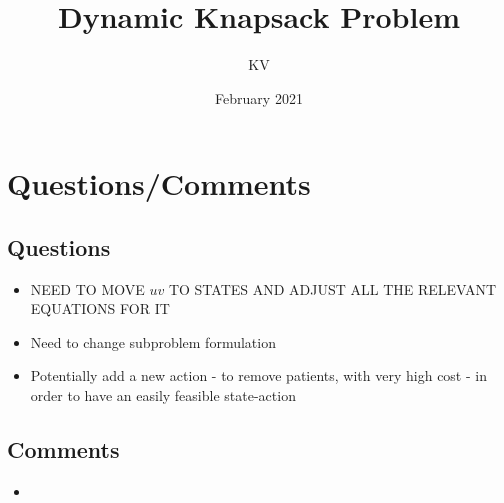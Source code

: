 \documentclass{article}
\title{Dynamic Knapsack Problem}
\author{KV}
\date{February 2021}
\begin{document}
\maketitle
\tableofcontents

\section{Questions/Comments}

\subsection{Questions}
\begin{itemize}
	\item  NEED TO MOVE $uv$ TO STATES AND ADJUST ALL THE RELEVANT EQUATIONS FOR IT
	\item Need to change subproblem formulation
	\item Potentially add a new action - to remove patients, with very high cost - in order to have an easily feasible state-action
\end{itemize}

\subsection{Comments}
\begin{itemize}
	\item
\end{itemize}
\end{document}

